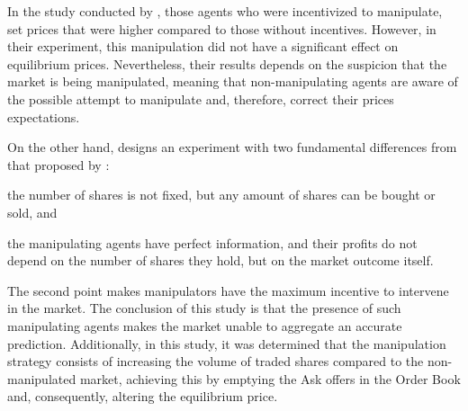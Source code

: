 In the study conducted by \citeauthor{HANSON2006449}, those agents who were incentivized to manipulate, set prices that were higher compared to those without incentives. However, in their experiment, this manipulation did not have a significant effect on equilibrium prices. Nevertheless, their results depends on the suspicion that the market is being manipulated, meaning that non-manipulating agents are aware of the possible attempt to manipulate and, therefore, correct their prices expectations.
    
On the other hand, \citeauthor{deck2013affecting} designs an experiment with two fundamental differences from that proposed by : \begin{enumerate*}[label=(\roman*)]
    \item the number of shares is not fixed, but any amount of shares can be bought or sold, and
    \item the manipulating agents have perfect information, and their profits do not depend on the number of shares they hold, but on the market outcome itself.
\end{enumerate*} 
The second point makes manipulators have the maximum incentive to intervene in the market. The conclusion of this study is that the presence of such manipulating agents makes the market unable to aggregate an accurate prediction. Additionally, in this study, it was determined that the manipulation strategy consists of increasing the volume of traded shares compared to the non-manipulated market, achieving this by emptying the Ask offers in the Order Book and, consequently, altering the equilibrium price.